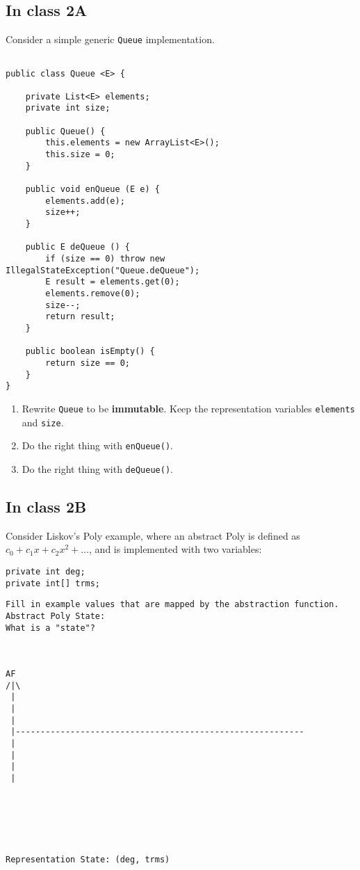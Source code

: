 \documentclass[11pt]{article}
\begin{document}
\subsection{In class 2A}
\label{sec:org6c8dcae}
Consider a simple generic \texttt{Queue} implementation.
\begin{verbatim}

public class Queue <E> {

    private List<E> elements;
    private int size;

    public Queue() {   
        this.elements = new ArrayList<E>();
        this.size = 0;
    }

    public void enQueue (E e) {
        elements.add(e);
        size++;
    }

    public E deQueue () {
        if (size == 0) throw new IllegalStateException("Queue.deQueue");
        E result = elements.get(0);
        elements.remove(0);
        size--;
        return result;
    }

    public boolean isEmpty() {
        return size == 0;
    }
}

\end{verbatim}

\begin{enumerate}
\item Rewrite \texttt{Queue} to be \textbf{immutable}. Keep the representation variables \texttt{elements} and \texttt{size}.
\item Do the right thing with \texttt{enQueue()}.
\item Do the right thing with \texttt{deQueue()}.
\end{enumerate}


\subsection{In class 2B}
\label{sec:orgc5a4384}
Consider Liskov's Poly example, where an abstract Poly is defined as \(c_0 + c_1x + c_2x^2 + \dots\), and is implemented with two variables:
\begin{verbatim}
private int deg;
private int[] trms;
\end{verbatim}

\begin{verbatim}
Fill in example values that are mapped by the abstraction function.
Abstract Poly State:
What is a "state"?



AF
/|\
 |        
 |
 |
 |----------------------------------------------------------
 |
 |
 |
 |        






Representation State: (deg, trms)
\end{verbatim}
\end{document}
